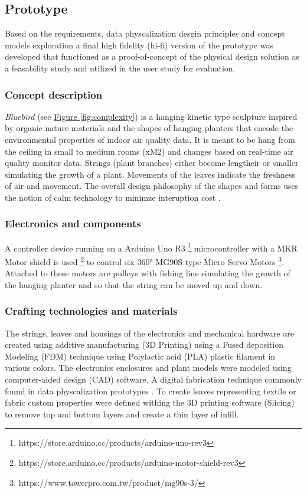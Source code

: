 \subsection{Prototype}

Based on the requirements, data physcalization desgin principles and concept models exploration a final high fidelity (hi-fi) version of the prototype was developed that functioned as a proof-of-concept of the physical design solution as a feasability study and utilized in the user study for evaluation.



\subsubsection{Concept description}

\textit{Bluebird} (see \hyperref[fig:complexity]{Figure \ref*{fig:complexity}}) is a hanging kinetic type sculpture inspired by organic nature materials and the shapes of hanging planters that encode the environmental properties of indoor air quality data. It is meant to be hang from the ceiling in small to medium rooms (xM2) and changes based on real-time air quality monitor data. Strings (plant branches) either become lengtheir or smaller simulating the growth of a plant. Movements of the leaves indicate the freshness of air and movement. The overall design philosophy of the shapes and forms uses the notion of calm technology to minimze interuption cost \cite{case_calm_2016}. 

\subsubsection{Electronics and components}

A controller device running on a Arduino Uno R3 \footnote{https://store.arduino.cc/products/arduino-uno-rev3} microcontroller with a MKR Motor shield is used \footnote{https://store.arduino.cc/products/arduino-motor-shield-rev3} to control six 360° MG90S type Micro Servo Motors \footnote{https://www.towerpro.com.tw/product/mg90s-3/}. Attached to these motors are pulleys with fishing line simulating the growth of the hanging planter and so that the string can be moved up and down.


\subsubsection{Crafting technologies and materials}
The strings, leaves and housings of the electronics and mechanical hardware are created using additive manufacturing (3D Printing) using a Fused deposition Modeling (FDM) technique using Polylactic acid (PLA) plastic filament in various colors. The electronics enclosures and plant models were modeled using computer-aided design (CAD) software. A digital fabrication technique commonly found in data physcalization prototypes \cite{anhalt_university_germany_design_2022}. To create leaves representing textile or fabric custom properties were defined withing the 3D printing software (Slicing) to remove top and bottom layers and create a thin layer of infill.

